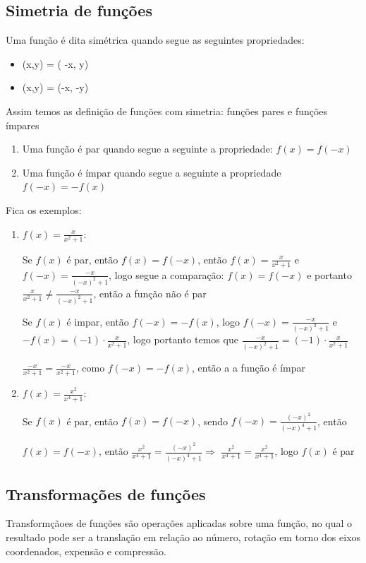 \begin{multicols*}{2}
    \subsection{Simetria de funções}
    Uma função é dita simétrica quando segue as seguintes propriedades:
    \begin{itemize}
        \item (x,y) = ( -x, y)
        \item (x,y) = (-x, -y)
    \end{itemize}
    Assim temos as definição de funções com simetria: funções pares e funções ímpares
    \begin{enumerate}
        \item Uma função é par quando segue a seguinte a propriedade: $f(x) = f(-x)$
        \item Uma função é ímpar quando segue a seguinte a propriedade $f(-x) = -f(x)$
    \end{enumerate}
    Fica os exemplos:
    \begin{enumerate}
        \item $	f(x) = \frac{x}{x^2 + 1} $:

              Se $f(x)$ é par, então $f(x) = f(-x)$, então $f(x) = \frac{x}{x^2 +1 }$ e
              $f(-x) = \frac{-x}{(-x)^2 +1}$, logo segue a comparação: $f(x) = f(-x)$ e portanto
              $\frac{x}{x^2 +1 } \ne \frac{ -x}{ (-x)^2 +1}$, então a função não é par

              Se $f(x)$ é impar, então $f(-x) = -f(x)$, logo $f(-x) = \frac{-x}{(-x)^2 +1}$ e
              $-f(x) = (-1) \cdot \frac{x}{x^2 +1}$, logo portanto temos que
              $\frac{-x}{(-x)^2 +1} = (-1) \cdot \frac{x}{x^2 +1} $

              $\frac{-x}{x^2 +1} = \frac{-x}{x^2 +1} $, como $f(-x) = -f(x)$, então a a função é
              ímpar

        \item $f(x) = \frac{x^2}{x^4 +1}$:

              Se $f(x)$ é par, então $f(x) = f(-x)$, sendo $f(-x) = \frac{(-x)^2}{(-x)^4 + 1}$, então

              $f(x) = f(-x)$, então $ \frac{x^2}{x^4 +1} = \frac{(-x)^2}{(-x)^4 + 1} \Rightarrow$
              $\frac{x^2}{x^4 +1} = \frac{x^2}{x^4 + 1}$, logo $f(x)$ é par

    \end{enumerate}

    \subsection{Transformações de funções}
    Transformçãoes de funções são operações aplicadas sobre uma função, no qual o  resultado pode 			ser a translação em relação ao número, rotação em torno dos eixos coordenados, expensão e 				compressão.


\end{multicols*}
